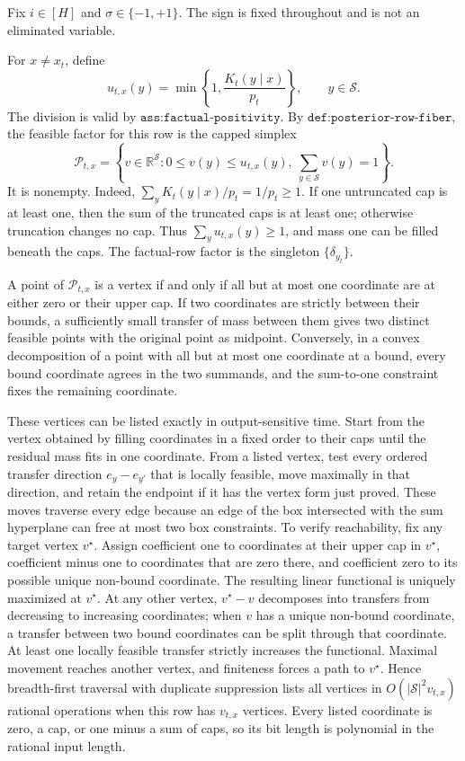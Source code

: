 Fix \(i\in[H]\) and \(\sigma\in\{-1,+1\}\).  The sign is fixed throughout and is not an eliminated variable.

For \(x\ne x_t\), define
\[
 u_{t,x}(y)=\min\!\left\{1,\frac{K_t(y\mid x)}{p_t}\right\},
 \qquad y\in\mathcal S.
 \tag{1}
\]
The division is valid by \(\texttt{ass:factual-positivity}\).  By \(\texttt{def:posterior-row-fiber}\), the feasible factor for this row is the capped simplex
\[
 \mathcal P_{t,x}=
 \left\{v\in\mathbb R^{\mathcal S}:0\le v(y)\le u_{t,x}(y),\ 
              \sum_{y\in\mathcal S}v(y)=1\right\}.
 \tag{2}
\]
It is nonempty.  Indeed, \(\sum_yK_t(y\mid x)/p_t=1/p_t\ge1\).  If one untruncated cap is at least one, then the sum of the truncated caps is at least one; otherwise truncation changes no cap.  Thus \(\sum_yu_{t,x}(y)\ge1\), and mass one can be filled beneath the caps.  The factual-row factor is the singleton \(\{\delta_{y_t}\}\).

A point of \(\mathcal P_{t,x}\) is a vertex if and only if all but at most one coordinate are at either zero or their upper cap.  If two coordinates are strictly between their bounds, a sufficiently small transfer of mass between them gives two distinct feasible points with the original point as midpoint.  Conversely, in a convex decomposition of a point with all but at most one coordinate at a bound, every bound coordinate agrees in the two summands, and the sum-to-one constraint fixes the remaining coordinate.

These vertices can be listed exactly in output-sensitive time.  Start from the vertex obtained by filling coordinates in a fixed order to their caps until the residual mass fits in one coordinate.  From a listed vertex, test every ordered transfer direction \(e_y-e_{y'}\) that is locally feasible, move maximally in that direction, and retain the endpoint if it has the vertex form just proved.  These moves traverse every edge because an edge of the box intersected with the sum hyperplane can free at most two box constraints.  To verify reachability, fix any target vertex \(v^\star\).  Assign coefficient one to coordinates at their upper cap in \(v^\star\), coefficient minus one to coordinates that are zero there, and coefficient zero to its possible unique non-bound coordinate.  The resulting linear functional is uniquely maximized at \(v^\star\).  At any other vertex, \(v^\star-v\) decomposes into transfers from decreasing to increasing coordinates; when \(v\) has a unique non-bound coordinate, a transfer between two bound coordinates can be split through that coordinate.  At least one locally feasible transfer strictly increases the functional.  Maximal movement reaches another vertex, and finiteness forces a path to \(v^\star\).  Hence breadth-first traversal with duplicate suppression lists all vertices in \(O(|\mathcal S|^2v_{t,x})\) rational operations when this row has \(v_{t,x}\) vertices.  Every listed coordinate is zero, a cap, or one minus a sum of caps, so its bit length is polynomial in the rational input length.

